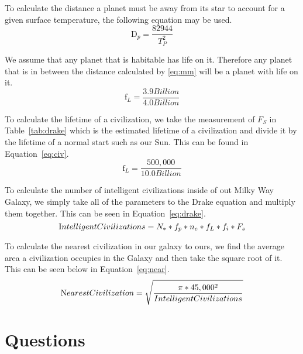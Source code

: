 \documentclass{article}
\begin{document}
To calculate the distance a planet must be away from its star to account for a given surface temperature, the following
equation may be used.
\begin{equation}
\label{eq:mm}
\text{D}_{p} = \frac{82944}{{T}_{P}^{2}}
\end{equation}

We assume that any planet that is habitable has life on it.  Therefore any planet that is in between the distance calculated by \ref{eq:mm} will be a planet with life on it.
\begin{equation}
\label{eq:life}
\text{f}_{L} = \frac{3.9 Billion}{4.0 Billion}
\end{equation}

To calculate the lifetime of a civilization, we take the measurement of ${F}_{S}$ in Table~\ref{tab:drake} which is the estimated
lifetime of a civilization and divide it by the lifetime of a normal start such as our Sun. This can be found in Equation~\ref{eq:civ}.
\begin{equation}
\label{eq:civ}
\text{f}_{L} = \frac{500,000}{10.0 Billion}
\end{equation}

To calculate the number of intelligent civilizations inside of out Milky Way Galaxy, we simply take all of the parameters to the Drake equation and multiply them together. This can be seen in Equation~\ref{eq:drake}.
\begin{equation}
\label{eq:drake}
\text Intelligent Civilizations = {N}_{*} * {f}_{p} * {n}_{e} * {f}_{L} * {f}_{i} * {F}_{s}
\end{equation}

To calculate the nearest civilization in our galaxy to ours, we find the average area a civilization occupies in the Galaxy and then take the square root of it. This can be seen below in Equation~\ref{eq:near}.
\begin{equation}
\label{eq:near}
\text Nearest Civilization = \sqrt{\frac{\pi * 45,000^{2}}{Intelligent Civilizations}}
\end{equation}




\section{Questions}
\label{sec:qna}
\end{document}
